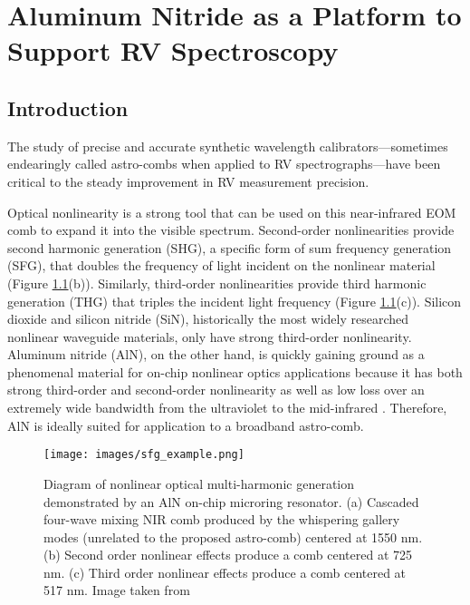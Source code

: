 \chapter{Aluminum Nitride as a Platform to Support RV Spectroscopy} \label{chapter:astro-comb}

\section{Introduction} \label{astro-comb:intro}

The study of precise and accurate synthetic wavelength calibrators---sometimes endearingly called astro-combs when applied to RV spectrographs---have been critical to the steady improvement in RV measurement precision.



Optical nonlinearity is a strong tool that can be used on this near-infrared EOM comb to expand it into the visible spectrum. Second-order nonlinearities provide second harmonic generation (SHG), a specific form of sum frequency generation (SFG), that doubles the frequency of light incident on the nonlinear material (Figure \ref{fig:sfg_example}(b)). Similarly, third-order nonlinearities provide third harmonic generation (THG) that triples the incident light frequency (Figure \ref{fig:sfg_example}(c)). Silicon dioxide and silicon nitride (SiN), historically the most widely researched nonlinear waveguide materials, only have strong third-order nonlinearity. Aluminum nitride (AlN), on the other hand, is quickly gaining ground as a phenomenal material for on-chip nonlinear optics applications because it has both strong third-order and second-order nonlinearity as well as low loss over an extremely wide bandwidth from the ultraviolet to the mid-infrared \citep{Jung2016}. Therefore, AlN is ideally suited for application to a broadband astro-comb.

\begin{figure}
    \centering
    \texttt{[image: images/sfg\_example.png]}
    \caption{Diagram of nonlinear optical multi-harmonic generation demonstrated by an AlN on-chip microring resonator. (a) Cascaded four-wave mixing NIR comb produced by the whispering gallery modes (unrelated to the proposed astro-comb) centered at 1550 nm. (b) Second order nonlinear effects produce a comb centered at 725 nm. (c) Third order nonlinear effects produce a comb centered at 517 nm. Image taken from \cite{Jung2014a}}
    \label{fig:sfg_example}
\end{figure}

